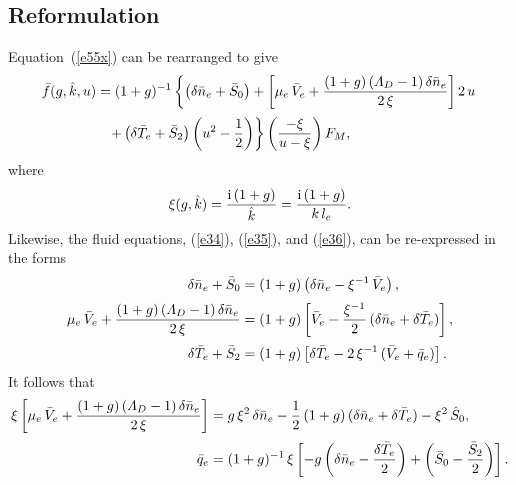 \documentclass[12pt,prb,aps]{revtex4-1}
\begin{document}
\subsection{Reformulation}
Equation~(\ref{e55x}) can be rearranged to give
\begin{align}\label{e37}
\bar{f}(g,\hat{k},u)&=(1+g)^{-1}\left\{\left(\delta\bar{n}_e+\bar{S}_0\right)+\left[\mu_e\,\bar{V}_e+\frac{(1+g)\,({\mit\Lambda}_D-1)\,\delta\bar{n}_e}{2\,\xi}\right]2\,u
\right.\nonumber\\[0.5ex]
&\phantom{=}\left.+\left(\delta\bar{T}_e+\bar{S}_2\right)\left(u^2-\frac{1}{2}\right)\right\}\left(\frac{-\xi}{u-\xi}\right)F_M,
\end{align}
where
\begin{equation}
\xi (g,\hat{k})= \frac{{\rm i}\,(1+g)}{\hat{k}}= \frac{{\rm i}\,(1+g)}{k\,l_e}.
\end{equation}
Likewise, the fluid equations, (\ref{e34}), (\ref{e35}), and (\ref{e36}), can be re-expressed in the forms
\begin{align}\label{e39}
\delta\bar{n}_e+\bar{S}_0&= (1+g)\left(\delta\bar{n}_e-\xi^{-1}\,\bar{V}_e\right),\\[0.5ex]
\mu_e\,\bar{V}_e+\frac{(1+g)\,({\mit\Lambda}_D-1)\,\delta\bar{n}_e}{2\,\xi}&= (1+g)\left[\bar{V}_e-\frac{\xi^{-1}}{2}\,(\delta\bar{n}_e+\delta\bar{T}_e)\right],\\[0.5ex]
\delta\bar{T}_e+\bar{S}_2&= (1+g)\left[\delta \bar{T}_e-2\,\xi^{-1}\,(\bar{V}_e+\bar{q}_e)\right].\label{e41}
\end{align}
It follows that
\begin{align}\label{e42}
\xi\left[\mu_e\,\bar{V}_e+\frac{(1+g)\,({\mit\Lambda}_D-1)\,\delta\bar{n}_e}{2\,\xi}\right]& = g\,\xi^2\,\delta\bar{n}_e-\frac{1}{2}\,(1+g)\,(\delta \bar{n}_e+\delta\bar{T}_e)
-\xi^2\,\hat{S}_0,\\[0.5ex]
\bar{q}_e&= (1+g)^{-1}\,\xi\left[-g\left(\delta\bar{n}_e-\frac{\delta\bar{T}_e}{2}\right)+\left(\bar{S}_0-\frac{\bar{S}_2}{2}\right)\right].\label{e43}
\end{align}
\end{document}
